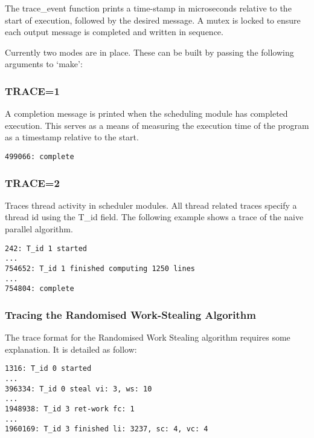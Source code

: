 The trace\_event function prints a time-stamp in microseconds relative to the start of execution,
followed by the desired message. A \gls{mutex} is locked to ensure each output message
is completed and written in sequence.

Currently two modes are in place.
These can be built by passing the following arguments to `make':
\subsubsection*{TRACE=1}
            A completion message is printed when the scheduling module has completed execution.
            This serves as a means of measuring the execution time of the program as a timestamp
            relative to the start.
            
\begin{lstlisting}
499066: complete
\end{lstlisting}


\subsubsection*{TRACE=2}
            Traces thread activity in scheduler modules. 
            All thread related traces specify a thread id using the T\_id field.
            The following example shows a trace of the naive parallel algorithm.
            
\begin{lstlisting}
242: T_id 1 started
...
754652: T_id 1 finished computing 1250 lines
...
754804: complete
\end{lstlisting}

\subsubsection*{Tracing the Randomised Work-Stealing Algorithm}

The trace format for the Randomised Work Stealing algorithm requires some explanation.
It is detailed as follow:
\\

\begin{lstlisting}[label = ls:wstraceeg,caption = Examples of the Four Traced Events for the Randomised Work-Stealing Scheme]
1316: T_id 0 started
...
396334: T_id 0 steal vi: 3, ws: 10
...
1948938: T_id 3 ret-work fc: 1
...
1960169: T_id 3 finished li: 3237, sc: 4, vc: 4
\end{lstlisting}

